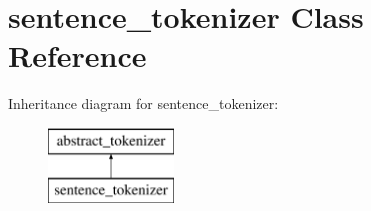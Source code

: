 \hypertarget{classsentence__tokenizer}{}\section{sentence\+\_\+tokenizer Class Reference}
\label{classsentence__tokenizer}
Inheritance diagram for sentence\+\_\+tokenizer\+:\begin{figure}[H]
\begin{center}
\leavevmode
\includegraphics[height=2.000000cm]{classsentence__tokenizer}
\end{center}
\end{figure}
